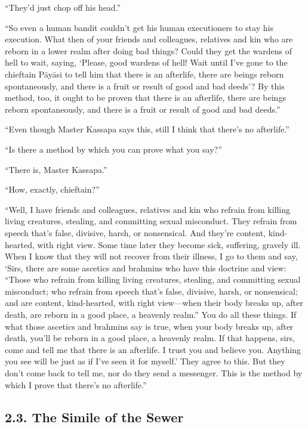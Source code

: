 \documentclass[12pt,openany]{book}%
\begin{document}
“They’d just chop off his head.” 

“So even a human bandit couldn’t get his human executioners to stay his execution. What then of your friends and colleagues, relatives and kin who are reborn in a lower realm after doing bad things? Could they get the wardens of hell to wait, saying, ‘Please, good wardens of hell! Wait until I’ve gone to the chieftain \textsanskrit{Pāyāsi} to tell him that there is an afterlife, there are beings reborn spontaneously, and there is a fruit or result of good and bad deeds’? By this method, too, it ought to be proven that there is an afterlife, there are beings reborn spontaneously, and there is a fruit or result of good and bad deeds.” 

“Even though Master Kassapa says this, still I think that there’s no afterlife.” 

“Is there a method by which you can prove what you say?” 

“There is, Master Kassapa.” 

“How, exactly, chieftain?” 

“Well, I have friends and colleagues, relatives and kin who refrain from killing living creatures, stealing, and committing sexual misconduct. They refrain from speech that’s false, divisive, harsh, or nonsensical. And they’re content, kind-hearted, with right view. Some time later they become sick, suffering, gravely ill. When I know that they will not recover from their illness, I go to them and say, ‘Sirs, there are some ascetics and brahmins who have this doctrine and view: “Those who refrain from killing living creatures, stealing, and committing sexual misconduct; who refrain from speech that’s false, divisive, harsh, or nonsensical; and are content, kind-hearted, with right view—when their body breaks up, after death, are reborn in a good place, a heavenly realm.” You do all these things. If what those ascetics and brahmins say is true, when your body breaks up, after death, you’ll be reborn in a good place, a heavenly realm. If that happens, sirs, come and tell me that there is an afterlife. I trust you and believe you. Anything you see will be just as if I’ve seen it for myself.’ They agree to this. But they don’t come back to tell me, nor do they send a messenger. This is the method by which I prove that there’s no afterlife.” 

\subsection*{2.3. The Simile of the Sewer }
\end{document}
